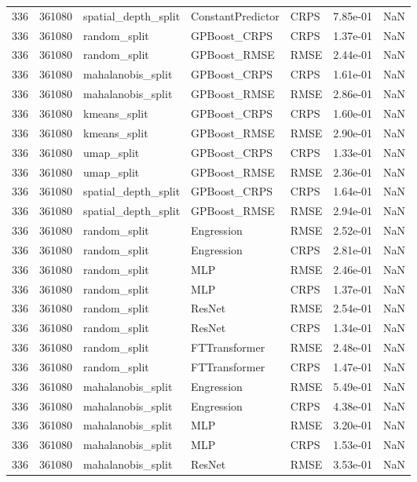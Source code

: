 \begin{tabular}{rrlllrr}
336 & 361080 & spatial\_depth\_split & ConstantPredictor & CRPS & 7.85e-01 & NaN \\
336 & 361080 & random\_split & GPBoost\_CRPS & CRPS & 1.37e-01 & NaN \\
336 & 361080 & random\_split & GPBoost\_RMSE & RMSE & 2.44e-01 & NaN \\
336 & 361080 & mahalanobis\_split & GPBoost\_CRPS & CRPS & 1.61e-01 & NaN \\
336 & 361080 & mahalanobis\_split & GPBoost\_RMSE & RMSE & 2.86e-01 & NaN \\
336 & 361080 & kmeans\_split & GPBoost\_CRPS & CRPS & 1.60e-01 & NaN \\
336 & 361080 & kmeans\_split & GPBoost\_RMSE & RMSE & 2.90e-01 & NaN \\
336 & 361080 & umap\_split & GPBoost\_CRPS & CRPS & 1.33e-01 & NaN \\
336 & 361080 & umap\_split & GPBoost\_RMSE & RMSE & 2.36e-01 & NaN \\
336 & 361080 & spatial\_depth\_split & GPBoost\_CRPS & CRPS & 1.64e-01 & NaN \\
336 & 361080 & spatial\_depth\_split & GPBoost\_RMSE & RMSE & 2.94e-01 & NaN \\
336 & 361080 & random\_split & Engression & RMSE & 2.52e-01 & NaN \\
336 & 361080 & random\_split & Engression & CRPS & 2.81e-01 & NaN \\
336 & 361080 & random\_split & MLP & RMSE & 2.46e-01 & NaN \\
336 & 361080 & random\_split & MLP & CRPS & 1.37e-01 & NaN \\
336 & 361080 & random\_split & ResNet & RMSE & 2.54e-01 & NaN \\
336 & 361080 & random\_split & ResNet & CRPS & 1.34e-01 & NaN \\
336 & 361080 & random\_split & FTTransformer & RMSE & 2.48e-01 & NaN \\
336 & 361080 & random\_split & FTTransformer & CRPS & 1.47e-01 & NaN \\
336 & 361080 & mahalanobis\_split & Engression & RMSE & 5.49e-01 & NaN \\
336 & 361080 & mahalanobis\_split & Engression & CRPS & 4.38e-01 & NaN \\
336 & 361080 & mahalanobis\_split & MLP & RMSE & 3.20e-01 & NaN \\
336 & 361080 & mahalanobis\_split & MLP & CRPS & 1.53e-01 & NaN \\
336 & 361080 & mahalanobis\_split & ResNet & RMSE & 3.53e-01 & NaN \\

\end{tabular}
